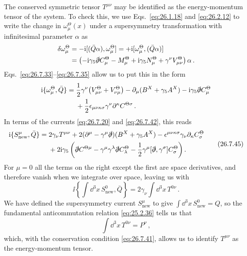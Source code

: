 The conserved symmetric tensor \(T^{\mu\nu}\) may be identified as the
energy-momentum tensor of the system. To check this, we use
Eqs.~\eqref{eq:26.1.18} and \eqref{eq:26.2.12} to write the change in
\(\omega_\mu^\Theta(x)\) under a supersymmetry transformation with
infinitesimal parameter \(\alpha\) as
\[
  \begin{aligned}
  \delta\omega_\mu^\Theta
  &=-\mathrm{i}[(\bar Q\alpha),\omega_\mu^\Theta]
    =+\mathrm{i}[\omega_\mu^\Theta,(\bar Q\alpha)]
  \\
  &=\left(
    -\mathrm{i}\gamma_5\slashed{\partial}C_\mu^\Theta
    -M_\mu^\Theta+\mathrm{i}\gamma_5N_\mu^\Theta
    +\gamma^\nu V_{\mu\nu}^\Theta
  \right)\alpha\,.
  \end{aligned}
\]
Eqs.~\eqref{eq:26.7.33}--\eqref{eq:26.7.35} allow us to put this in the
form
\[
  \begin{aligned}
  \mathrm{i}\{\omega_\mu^\Theta,\bar Q\}
  ={}&\frac12\gamma^\nu
      \bigl(V_{\mu\nu}^\Theta+V_{\nu\mu}^\Theta\bigr)
     -\partial_\mu(B^X+\gamma_5A^X)
     -\mathrm{i}\gamma_5\slashed{\partial}C_\mu^\Theta
  \\
     &+\frac12\epsilon_{\mu\nu\kappa\sigma}
      \gamma^\nu\partial^\kappa C^{\Theta\sigma}\,.
  \end{aligned}
\]
In terms of the currents \eqref{eq:26.7.20} and \eqref{eq:26.7.42}, this
reads
\begin{equation}
  \begin{aligned}
  \mathrm{i}\{S_{\mathrm{new}}^\mu,\bar Q\}
  ={}&2\gamma_\nu T^{\mu\nu}
     +2(\partial^\mu-\gamma^\mu\slashed{\partial})
      (B^X+\gamma_5A^X)
     -\epsilon^{\mu\nu\kappa\sigma}\gamma_\nu
      \partial_\kappa C_\sigma^\Theta
  \\
    &+2\mathrm{i}\gamma_5\left(
       \slashed{\partial}C^{\Theta\mu}
       -\gamma^\mu\gamma^\lambda\slashed{\partial}C_\lambda^\Theta
       -\frac12\gamma^\mu[\slashed{\partial},\gamma^\sigma]
        C_\sigma^\Theta
      \right).
  \end{aligned}
  \tag{26.7.45}\label{eq:26.7.45}
\end{equation}
For \(\mu=0\) all the terms on the right except the first are space
derivatives, and therefore vanish when we integrate over space, leaving us
with
\begin{equation}
  \ii\left\{
    \int \dd^3x\,S_{\mathrm{new}}^0,\bar Q
  \right\}
  =2\gamma_\nu\int \dd^3x\,T^{0\nu}\,.
  \tag{26.7.46}\label{eq:26.7.46}
\end{equation}
We have defined the supersymmetry current \(S_{\mathrm{new}}^\mu\) to give
\(\int \dd^3x\,S_{\mathrm{new}}^0=Q\), so the fundamental anticommutation
relation \eqref{eq:25.2.36} tells us that
\begin{equation}
  \int \dd^3x\,T^{0\nu}=P^\nu\,,
  \tag{26.7.47}\label{eq:26.7.47}
\end{equation}
which, with the conservation condition \eqref{eq:26.7.41}, allows us to
identify \(T^{\mu\nu}\) as the energy-momentum tensor.

